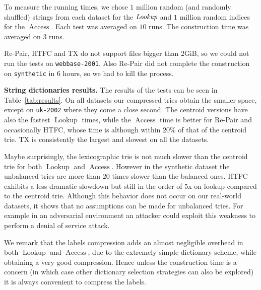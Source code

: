 \documentclass[a4paper,11pt]{article}
\newcommand{\ttlpar}[1]{\noindent\textbf{#1}}
\theoremstyle{nonumberplain}
\DeclareMathOperator{\Access}{Access}
\DeclareMathOperator{\Lookup}{Lookup}
\begin{document}
To measure the running times, we chose $1$ million random (and
randomly shuffled) strings from each dataset for the $\emph{Lookup}$
and $1$ million random indices for the $\Access$. Each test was
averaged on $10$ runs. The construction time was averaged on $3$ runs.

Re-Pair, HTFC and TX do not support files bigger than $2$GiB, so we
could not run the tests on \texttt{webbase-2001}. Also Re-Pair did not
complete the construction on \texttt{synthetic} in 6 hours, so we had
to kill the process.

\ttlpar{String dictionaries results.} 
The results of the tests can be
seen in Table~\ref{tab:results}. On all datasets our compressed tries
obtain the smaller space, except on \texttt{uk-2002} where they come a
close second. The centroid versions have also the fastest $\Lookup$
times, while the $\Access$ time is better for Re-Pair and occasionally
HTFC, whose time is although within $20$\% of that of the centroid
trie. TX is consistently the largest and slowest on all the datasets.

Maybe surprisingly, the lexicographic trie is not much slower than the
centroid trie for both $\Lookup$ and $\Access$. However in the
synthetic dataset the unbalanced tries are more than $20$ times slower
than the balanced ones. HTFC exhibits a less dramatic slowdown but still in
the order of $5$x on lookup compared to the centroid trie. Although
this behavior does not occur on our real-world datasets, it shows that
no assumptions can be made for unbalanced tries. For example in an
adversarial environment an attacker could exploit this weakness to
perform a denial of service attack.

We remark that the labels compression adds an almost negligible
overhead in both $\Lookup$ and $\Access$, due to the extremely simple
dictionary scheme, while obtaining a very good compression. 
Hence unless the construction time is a concern (in which case
other dictionary selection strategies can also be explored) 
it is always convenient to compress the labels.
\end{document}
